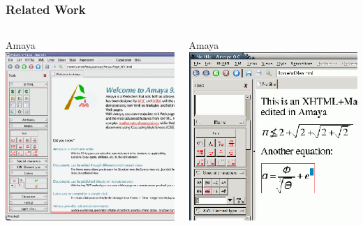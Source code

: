 \begin{frame}
	\frametitle{Related Work}
	\begin{columns}[T]
		\begin{column}{5.5cm}
				\begin{block}{Amaya}
					\includegraphics[width=1\textwidth]{./images/highlight2.png}
				\end{block}
		\end{column}
		\begin{column}{5.5cm}
			\begin{block}{Amaya}
				\includegraphics[width=1\textwidth]{./images/highlight3.png}
			\end{block}
		\end{column}
	\end{columns}
\end{frame}
